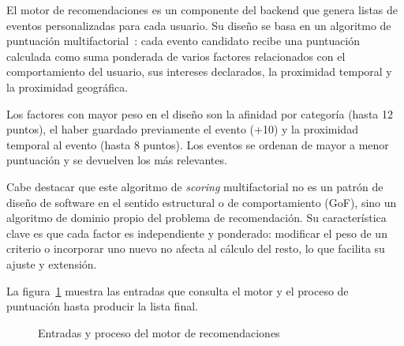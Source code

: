 El motor de recomendaciones es un componente del backend que genera listas de eventos personalizadas para cada usuario. Su diseño se basa en un algoritmo de puntuación multifactorial~\cite{ricci2015recommender}: cada evento candidato recibe una puntuación calculada como suma ponderada de varios factores relacionados con el comportamiento del usuario, sus intereses declarados, la proximidad temporal y la proximidad geográfica.

Los factores con mayor peso en el diseño son la afinidad por categoría (hasta 12 puntos), el haber guardado previamente el evento (+10) y la proximidad temporal al evento (hasta 8 puntos). Los eventos se ordenan de mayor a menor puntuación y se devuelven los más relevantes.

Cabe destacar que este algoritmo de \textit{scoring} multifactorial no es un patrón de diseño de software en el sentido estructural o de comportamiento (GoF), sino un algoritmo de dominio propio del problema de recomendación. Su característica clave es que cada factor es independiente y ponderado: modificar el peso de un criterio o incorporar uno nuevo no afecta al cálculo del resto, lo que facilita su ajuste y extensión.

La figura~\ref{fig:flujo_recomendaciones} muestra las entradas que consulta el motor y el proceso de puntuación hasta producir la lista final.

\begin{figure}[H]
\centering
{}
\caption{Entradas y proceso del motor de recomendaciones}
\label{fig:flujo_recomendaciones}
\end{figure}


